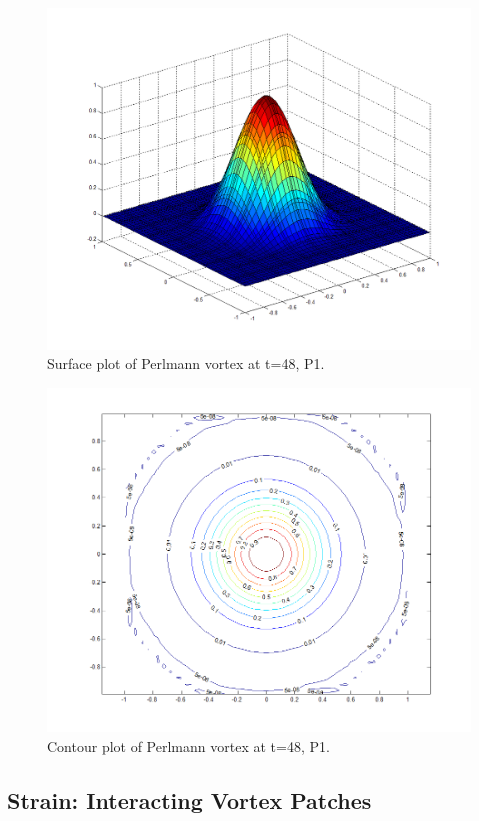 \documentclass[letterpaper,12pt]{report}
\begin{document}
\begin{figure}
\centering
\includegraphics[width=5in]{P1surf.PNG}
\caption{\label{fig:P1surf}Surface plot of Perlmann vortex at t=48, P1.}
\end{figure}
\begin{figure}
\centering
\includegraphics[width=5in]{P1cont.PNG}
\caption{\label{fig:P1cont}Contour plot of Perlmann vortex at t=48, P1.}
\end{figure}

\subsection{Strain: Interacting Vortex Patches}
\end{document}
